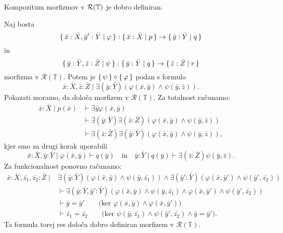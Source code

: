 \documentclass[../kategoricna_logika.tex]{subfiles}
\begin{document}
  \begin{lema}
    Kompozitum morfizmov v $\mathcal{R}(\mathbb{T})$ je dobro definiran.
  \end{lema}
  \begin{dokaz}
    Naj bosta
    $$\lbrace\,\bar{x}:\bar{X},\bar{y}':\bar{Y} \mid  \varphi\,\rbrace :
    \lbrace\,\bar{x}:\bar{X} \mid p\,\rbrace \to \lbrace\,\bar{y}:\bar{Y} \mid q\,\rbrace$$
    in
    $$\lbrace\,\bar{y}:\bar{Y},\bar{z}:\bar{Z} \mid  \psi\,\rbrace :
    \lbrace\,\bar{y}:\bar{Y} \mid q\,\rbrace \to \lbrace\,\bar{z}:\bar{Z} \mid r\,\rbrace$$
    morfizma v
    $\mathcal{R}(\mathbb{T})$.  Potem je
    $\lbrace\,\psi\,\rbrace \circ \lbrace\,\varphi\,\rbrace$ podan s formulo
    \[ \bar{x}:\bar{X}, \bar{z}:\bar{Z} \mid
      \exists (\bar{y}:\bar{Y})(\varphi(\bar{x},\bar{y}) \land \psi(\bar{y},\bar{z})). \]
    Pokazati moramo, da določa morfizem v
    $\mathcal{R}(\mathbb{T})$. Za totalnost računamo:
    \begin{align*}
      \bar{x}:\bar{X} \mid p(\bar{x}) &\vdash \exists \bar{y} \varphi(\bar{x},\bar{y}) \\
                                      &\vdash \exists (\bar{y}:\bar{Y}) \exists (\bar{z}:\bar{Z})
                                        (\varphi(\bar{x},\bar{y}) \land \psi(\bar{y},\bar{z})) \\
                    &\vdash \exists (\bar{z}:\bar{Z}) \exists (\bar{y}:\bar{Y}) (\varphi(\bar{x},\bar{y}) \land \psi(\bar{y},\bar{z})),
    \end{align*}
    kjer smo za drugi korak uporabili
    \[\bar{x}:\bar{X},\bar{y}:\bar{Y} \mid \varphi(\bar{x},\bar{y}) \vdash q(\bar{y})
      \quad \text{in}\quad \bar{y}:\bar{Y}
      \mid q(\bar{y}) \vdash \exists (\bar{z}:\bar{Z}) \psi(\bar{y},\bar{z}).\] Za funkcionalnost
    ponovno računamo:
    \begin{align*}
      \bar{x}:\bar{X},\bar{z_1},\bar{z_2}:\bar{Z} \mid&
                          \exists (\bar{y}:\bar{Y})(\varphi(\bar{x},\bar{y}) \land \psi(\bar{y},\bar{z_{1}})) \land \exists (\bar{y}':\bar{Y}) (\varphi(\bar{x},\bar{y}') \land \psi(\bar{y}',\bar{z_{2}})) \\
                        &\vdash \exists (\bar{y}:\bar{Y},\bar{y}':\bar{Y}) (\varphi(\bar{x},\bar{y}) \land \psi(\bar{y},\bar{z_{1}}) \land \varphi(\bar{x},\bar{y}') \land \psi(\bar{y}',\bar{z_{2}})) \\
                        &\vdash \bar{y} = \bar{y}' \qquad \text{(ker $\varphi(\bar{x},\bar{y}) \land \varphi(\bar{x},\bar{y}')$)} \\
                        &\vdash \bar{z_{1}} = \bar{z_{2}} \qquad \text{(ker $\psi(\bar{y},\bar{z_{1}}) \land \psi(\bar{y}',\bar{z_{2}}) \land \bar{y}=\bar{y}'$)}.
    \end{align*}
    Ta formula torej res določa dobro definiran morfizem v
    $\mathcal{R}(\mathbb{T})$.
  \end{dokaz}
\end{document}
